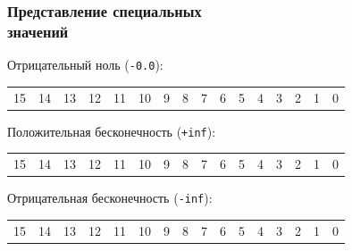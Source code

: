 \documentclass[compress, 8pt, aspectratio=169]{beamer}
\newenvironment{sixteenbit}{%
    \begin{center}
        \begin{tabular}{ |m{0.2cm}|m{0.2cm}|m{0.2cm}|m{0.2cm}|m{0.2cm}|m{0.2cm}|m{0.2cm}|m{0.2cm}|m{0.2cm}|m{0.2cm}|m{0.2cm}|m{0.2cm}|m{0.2cm}|m{0.2cm}|m{0.2cm}|m{0.2cm}|  }
            \hline
}{
        \hline
        \multicolumn{1}{c}{\color{gray}\tiny{15}} &
        \multicolumn{1}{c}{\color{gray}\tiny{14}} &
        \multicolumn{1}{c}{\color{gray}\tiny{13}} &
        \multicolumn{1}{c}{\color{gray}\tiny{12}} &
        \multicolumn{1}{c}{\color{gray}\tiny{11}} &
        \multicolumn{1}{c}{\color{gray}\tiny{10}} &
        \multicolumn{1}{c}{\color{gray}\tiny{9}} &
        \multicolumn{1}{c}{\color{gray}\tiny{8}} &
        \multicolumn{1}{c}{\color{gray}\tiny{7}} &
        \multicolumn{1}{c}{\color{gray}\tiny{6}} &
        \multicolumn{1}{c}{\color{gray}\tiny{5}} &
        \multicolumn{1}{c}{\color{gray}\tiny{4}} &
        \multicolumn{1}{c}{\color{gray}\tiny{3}} &
        \multicolumn{1}{c}{\color{gray}\tiny{2}} &
        \multicolumn{1}{c}{\color{gray}\tiny{1}} &
        \multicolumn{1}{c}{\color{gray}\tiny{0}} \\
        \end{tabular}
    \end{center}
}
\begin{document}
\begin{frame}[fragile]

    \frametitle{Представление специальных \\ значений}

    Отрицательный ноль (\verb|-0.0|):

    \begin{sixteenbit}
        \cellcolor{blue!40!white}{1} &
        \cellcolor{green!40!white}{0} &
        \cellcolor{green!40!white}{0} &
        \cellcolor{green!40!white}{0} &
        \cellcolor{green!40!white}{0} &
        \cellcolor{green!40!white}{0} &
        \cellcolor{red!40!white}{0} &
        \cellcolor{red!40!white}{0} &
        \cellcolor{red!40!white}{0} &
        \cellcolor{red!40!white}{0} &
        \cellcolor{red!40!white}{0} &
        \cellcolor{red!40!white}{0} &
        \cellcolor{red!40!white}{0} &
        \cellcolor{red!40!white}{0} &
        \cellcolor{red!40!white}{0} &
        \cellcolor{red!40!white}{0} \\
    \end{sixteenbit}

    Положительная бесконечность (\verb|+inf|):

    \begin{sixteenbit}
        \cellcolor{blue!40!white}{0} &
        \cellcolor{green!40!white}{1} &
        \cellcolor{green!40!white}{1} &
        \cellcolor{green!40!white}{1} &
        \cellcolor{green!40!white}{1} &
        \cellcolor{green!40!white}{1} &
        \cellcolor{red!40!white}{0} &
        \cellcolor{red!40!white}{0} &
        \cellcolor{red!40!white}{0} &
        \cellcolor{red!40!white}{0} &
        \cellcolor{red!40!white}{0} &
        \cellcolor{red!40!white}{0} &
        \cellcolor{red!40!white}{0} &
        \cellcolor{red!40!white}{0} &
        \cellcolor{red!40!white}{0} &
        \cellcolor{red!40!white}{0} \\
    \end{sixteenbit}

    Отрицательная бесконечность (\verb|-inf|):

    \begin{sixteenbit}
        \cellcolor{blue!40!white}{1} &
        \cellcolor{green!40!white}{1} &
        \cellcolor{green!40!white}{1} &
        \cellcolor{green!40!white}{1} &
        \cellcolor{green!40!white}{1} &
        \cellcolor{green!40!white}{1} &
        \cellcolor{red!40!white}{0} &
        \cellcolor{red!40!white}{0} &
        \cellcolor{red!40!white}{0} &
        \cellcolor{red!40!white}{0} &
        \cellcolor{red!40!white}{0} &
        \cellcolor{red!40!white}{0} &
        \cellcolor{red!40!white}{0} &
        \cellcolor{red!40!white}{0} &
        \cellcolor{red!40!white}{0} &
        \cellcolor{red!40!white}{0} \\
    \end{sixteenbit}


\end{frame}
\end{document}
